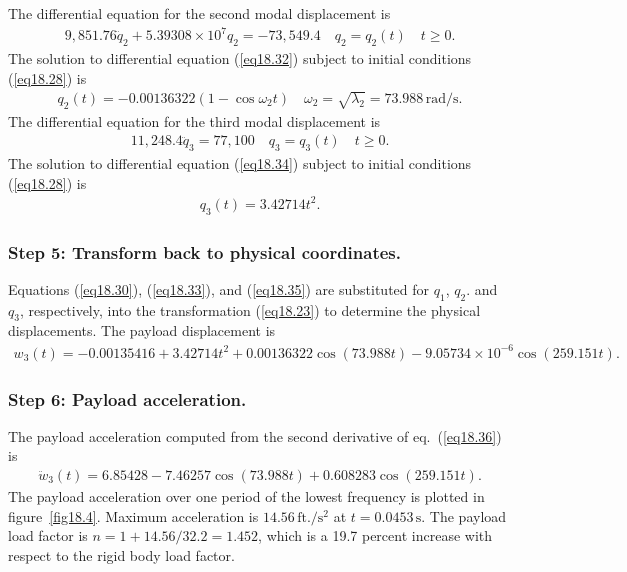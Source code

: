 \documentclass{AeroStructure-ERJohnson}
\begin{document}
The differential equation for the second modal displacement is
\begin{align}\label{eq18.32}
9,851.76 \ddot{q}_{2}+5.39308 \times 10^{7} q_{2}=-73,549.4 \quad q_{2}=q_{2}(t) \quad t \geq 0.
\end{align}
The solution to differential equation (\ref{eq18.32}) subject to initial conditions (\ref{eq18.28}) is
\begin{align}\label{eq18.33}
q_{2}(t)=-0.00136322\left(1-\cos \omega_{2} t\right) \quad \omega_{2}=\sqrt{\lambda_{2}}=73.988\,\mathrm{rad}/\mathrm{s}.
\end{align}
The differential equation for the third modal displacement is
\begin{align}\label{eq18.34}
11,248.4 \ddot{q}_{3}=77,100 \quad q_{3}=q_{3}(t) \quad t \geq 0.
\end{align}
The solution to differential equation (\ref{eq18.34}) subject to initial conditions (\ref{eq18.28}) is
\begin{align}\label{eq18.35}
q_{3}(t)=3.42714 t^{2}.
\end{align}

\subsubsection{Step 5: Transform back to physical coordinates.} Equations (\ref{eq18.30}), (\ref{eq18.33}), and (\ref{eq18.35}) are substituted for $q_1$, $q_2$. and $q_3$, respectively, into the transformation (\ref{eq18.23}) to determine the physical displacements. The payload displacement is
\begin{align}\label{eq18.36}
w_{3}(t)=-0.00135416+3.42714 t^{2}+0.00136322 \cos (73.988 t)-9.05734 \times 10^{-6} \cos (259.151 t).
\end{align}

\subsubsection{Step 6: Payload acceleration.} The payload acceleration computed from the second derivative of eq.~(\ref{eq18.36}) is
\begin{align}\label{eq18.37}
\ddot{w}_{3}(t)=6.85428-7.46257 \cos (73.988 t)+0.608283 \cos (259.151 t).
\end{align}
The payload acceleration over one period of the lowest frequency is plotted in figure~\ref{fig18.4}. Maximum acceleration is $14.56\,\mathrm{ft}./\mathrm{s}^{2}$ at $t=0.0453\,\mathrm{s}$. The payload load factor is $n=1+14.56/32.2=1.452$, which is a 19.7 percent increase with respect to the rigid body load factor.
\end{document}
